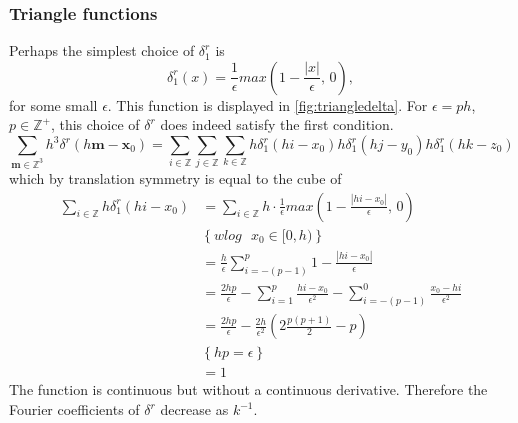 \documentclass[a4paper,
twoside=false,abstract=false,numbers=noenddot,
titlepage=false,headings=small,parskip=half,version=last]{scrartcl}
\begin{document}
\subsubsection{Triangle functions}\label{section:triangle-delta}
Perhaps the simplest choice of $\delta^{r}_{1}$ is
\begin{equation}
\delta^{r}_{1}(x) = \frac{1}{\epsilon}max\left(1-\frac{|x|}{\epsilon}\text{, }0\right),
\end{equation}
for some small $\epsilon$.
This function is displayed in \ref{fig:triangledelta}.
For $\epsilon=ph$, $p\in\mathbb{Z}^+$, this choice of $\delta^r$ does indeed satisfy the first condition.
\begin{equation}
\sum_{\mathbf{m}\in\mathbb{Z}^3}h^3\delta^{r}(h\mathbf{m}-\mathbf{x}_0)	= \sum_{i\in \mathbb{Z}}\sum_{j\in \mathbb{Z}}\sum_{k\in \mathbb{Z}}h\delta^{r}_1(hi-x_0)h\delta^{r}_1(hj-y_0)h\delta^{r}_1(hk-z_0)\label{eq:splitdelta3dto1d}
\end{equation}
which by translation symmetry is equal to the cube of
\begin{align}
\sum_{i\in \mathbb{Z}}h\delta^{r}_1(hi-x_0) &= \sum_{i\in \mathbb{Z}}h\cdot \frac{1}{\epsilon}max\left(1-\frac{|hi-x_0|}{\epsilon}\text{, }0\right)\nonumber\\
		& \left\{ wlog \text{ }x_0\in [0,h) \right\}\nonumber\\
		&= \frac{h}{\epsilon} \sum_{i=-(p-1)}^p 1-\frac{|hi-x_0|}{\epsilon}\nonumber\\
		&= \frac{2hp}{\epsilon} - \sum_{i=1}^p\frac{hi-x_0}{\epsilon^2} - \sum_{i=-(p-1)}^0\frac{x_0-hi}{\epsilon^2}\nonumber\\
		&= \frac{2hp}{\epsilon} - \frac{2h}{\epsilon^2}\left(2\frac{p(p+1)}{2} - p \right)\nonumber\\
		& \left\{ hp = \epsilon \right\}\nonumber\\
		&= 1\nonumber
\end{align}
The function is continuous but without a continuous derivative.
Therefore the Fourier coefficients of $\delta^r$ decrease as $k^{-1}$.

\end{document}
